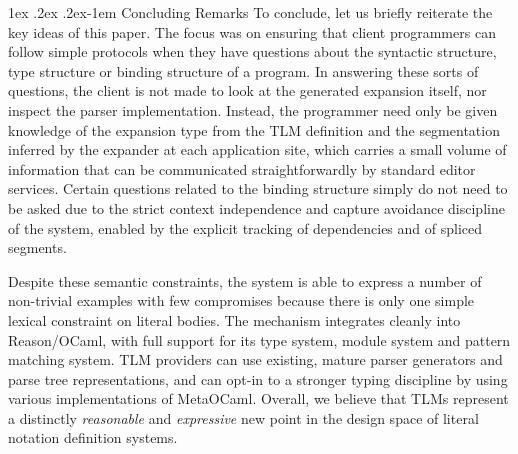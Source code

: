 \documentclass[acmsmall]{acmart}
\makeatletter
\renewcommand{\paragraph}{%
  \@startsection{paragraph}{4}%
  {\z@}{1ex \@plus .2ex \@minus .2ex}{-1em}%
  {\normalfont\normalsize\bfseries}%
}
\makeatother
\begin{document}



\paragraph{Concluding Remarks} 
To conclude, let us briefly reiterate the key ideas of this paper. The focus was on ensuring that client programmers can follow simple protocols when they have questions about the syntactic structure, type structure or binding structure of a program. In answering these sorts of questions,  the client is not made to look at the generated expansion itself, nor inspect the parser implementation. Instead, the programmer need only be given knowledge of the expansion type from the TLM definition and the segmentation inferred by the expander at each application site, which carries a small volume of information that can be communicated straightforwardly by standard editor services. Certain questions related to the binding structure simply do not need to be asked due to the strict context independence and capture avoidance discipline of the system, enabled by the explicit tracking of dependencies and of spliced segments. 

Despite these semantic constraints, the system is able to express a number of non-trivial examples with few compromises because there is only one simple lexical constraint on literal bodies. The mechanism integrates cleanly into Reason/OCaml, with full support for its type system, module system and pattern matching system. TLM providers can use existing, mature parser generators and parse tree representations, and can opt-in to a stronger typing discipline by using various implementations of MetaOCaml. Overall, we believe that TLMs represent a distinctly \emph{reasonable} and \emph{expressive} new point in the design space of literal notation definition systems.
\vspace{-5px}
\end{document}
